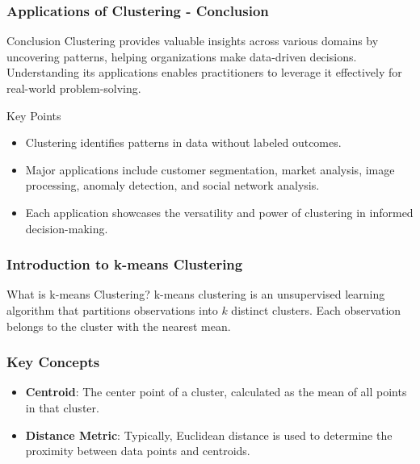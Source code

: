 \documentclass[aspectratio=169]{beamer}
\begin{document}
\begin{frame}[fragile]
  \frametitle{Applications of Clustering - Conclusion}
  \begin{block}{Conclusion}
    Clustering provides valuable insights across various domains by uncovering patterns, helping organizations make 
    data-driven decisions. Understanding its applications enables practitioners to leverage it effectively for 
    real-world problem-solving.
  \end{block}
  
  \begin{block}{Key Points}
    \begin{itemize}
      \item Clustering identifies patterns in data without labeled outcomes.
      \item Major applications include customer segmentation, market analysis, image processing, anomaly detection, and social network analysis.
      \item Each application showcases the versatility and power of clustering in informed decision-making.
    \end{itemize}
  \end{block}
\end{frame}

\begin{frame}[fragile]
    \frametitle{Introduction to k-means Clustering}
    \begin{block}{What is k-means Clustering?}
        k-means clustering is an unsupervised learning algorithm that partitions observations into \( k \) distinct clusters. Each observation belongs to the cluster with the nearest mean.
    \end{block}
\end{frame}

\begin{frame}[fragile]
    \frametitle{Key Concepts}
    \begin{itemize}
        \item \textbf{Centroid}: The center point of a cluster, calculated as the mean of all points in that cluster.
        \item \textbf{Distance Metric}: Typically, Euclidean distance is used to determine the proximity between data points and centroids.
    \end{itemize}
\end{frame}
\end{document}
